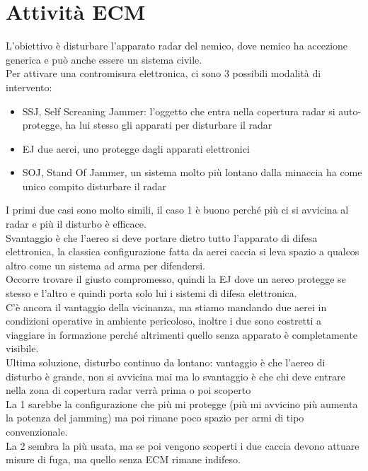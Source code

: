 \documentclass[oneside, 12pt]{extbook}
\begin{document}
\section{Attività ECM}
L'obiettivo è disturbare l'apparato radar del nemico, dove nemico ha accezione generica e può anche essere un sistema civile.\\
Per attivare una contromisura elettronica, ci sono 3 possibili modalità di intervento:
\begin{itemize}
	\item SSJ, Self Screaning Jammer: l'oggetto che entra nella copertura radar si auto-protegge, ha lui stesso gli apparati per disturbare il radar
	\item EJ due aerei, uno protegge dagli apparati elettronici
	\item SOJ, Stand Of Jammer, un sistema molto più lontano dalla minaccia ha come unico compito disturbare il radar
\end{itemize}
I primi due casi sono molto simili, il caso 1 è buono perché più ci si avvicina al radar e più il disturbo è efficace.\\
Svantaggio è che l'aereo si deve portare dietro tutto l'apparato di difesa elettronica, la classica configurazione fatta da aerei caccia si leva spazio a qualcos altro come un sistema ad arma per difendersi.\\
Occorre trovare il giusto compromesso, quindi la EJ dove un aereo protegge se stesso e l'altro e quindi porta solo lui i sistemi di difesa elettronica.\\
C'è ancora il vantaggio della vicinanza, ma stiamo mandando due aerei in condizioni operative in ambiente pericoloso, inoltre i due sono costretti a viaggiare in formazione perché altrimenti quello senza apparato è completamente visibile.\\
Ultima soluzione, disturbo continuo da lontano: vantaggio è che l'aereo di disturbo è grande, non si avvicina mai ma lo svantaggio è che chi deve entrare nella zona di copertura radar verrà prima o poi scoperto\\
La 1 sarebbe la configurazione che più mi protegge (più mi avvicino più aumenta la potenza del jamming) ma poi rimane poco spazio per armi di tipo convenzionale.\\
La 2 sembra la più usata, ma se poi vengono scoperti i due caccia devono attuare misure di fuga, ma quello senza ECM rimane indifeso.
\end{document}
